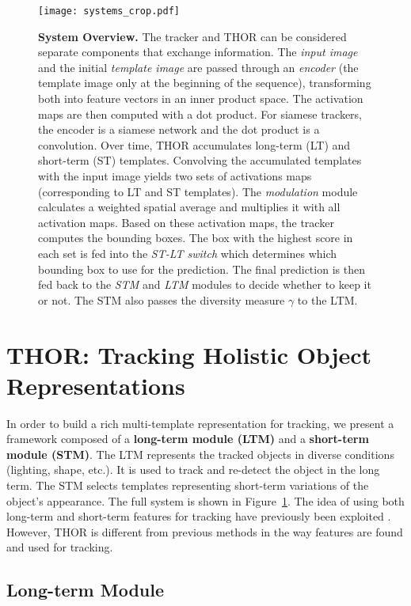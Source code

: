 \documentclass{article}
\begin{document}
\begin{figure}[htb!]
    \centering
    \texttt{[image: systems\_crop.pdf]}
    \caption{\textbf{System Overview.} The tracker and THOR can be considered separate components that exchange information.
    The \textit{input image} and the initial \textit{template image} are passed through an \textit{encoder} (the template image only at the beginning of the sequence), transforming both into feature vectors in an inner product space. The activation maps are then computed with a dot product. For siamese trackers, the encoder is a siamese network and the dot product is a convolution. Over time, THOR accumulates long-term (LT) and short-term (ST) templates. Convolving the accumulated templates with the input image yields two sets of activations maps (corresponding to LT and ST templates). The \textit{modulation} module calculates a weighted spatial average and multiplies it with all activation maps. Based on these activation maps, the tracker computes the bounding boxes. The box with the highest score in each set is fed into the \textit{ST-LT switch} which determines which bounding box to use for the prediction. The final prediction is then fed back to the \textit{STM} and \textit{LTM} modules to decide whether to keep it or not. The STM also passes the diversity measure $\gamma$ to the LTM.}
    \label{fig:system}
\end{figure}


\section{THOR: Tracking Holistic Object Representations} \label{sec:approach}

In order to build a rich multi-template representation for tracking, we present a framework composed of a \textbf{long-term module (LTM)} and a \textbf{short-term module (STM)}. The LTM represents the tracked objects in diverse conditions (lighting, shape, etc.). It is used to track and re-detect the object in the long term. The STM  selects templates representing short-term variations of the object's appearance. The full system is shown in Figure~\ref{fig:system}. The idea of using both long-term and short-term features for tracking have previously been exploited \cite{hong2015multi, lee2018memory}. However, THOR is different from previous methods in the way features are found and used for tracking.

\subsection{Long-term Module}\label{sec:longtermmodule}
\end{document}
